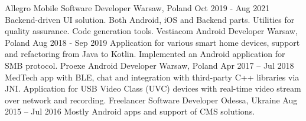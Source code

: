 \begin{cvsection}[Experience]
  \cvexperience
    {Allegro}
    {Mobile Software Developer}
    {Warsaw, Poland}
    {Oct 2019 - Aug 2021}
    {
      Backend-driven UI solution. Both Android, iOS and Backend parts.
      \newline
      Utilities for quality assurance. Code generation tools.
    }
  \cvexperience
    {Vestiacom}
    {Android Developer}
    {Warsaw, Poland}
    {Aug 2018 - Sep 2019}
    {
      Application for various smart home devices, support and refactoring from Java to Kotlin.
      \newline
      Implemented an Android application for SMB protocol.
    }
  \cvexperience
    {Proexe}
    {Android Developer}
    {Warsaw, Poland}
    {Apr 2017 – Jul 2018}
    {
      MedTech app with BLE, chat and integration with third-party C++ libraries via JNI.
      \newline
      Application for USB Video Class (UVC) devices with real-time video stream over network and recording.
    }
  \cvexperience
    {Freelancer}
    {Software Developer}
    {Odessa, Ukraine}
    {Aug 2015 – Jul 2016}
    {
      Mostly Android apps and support of CMS solutions.
    }
\end{cvsection}
